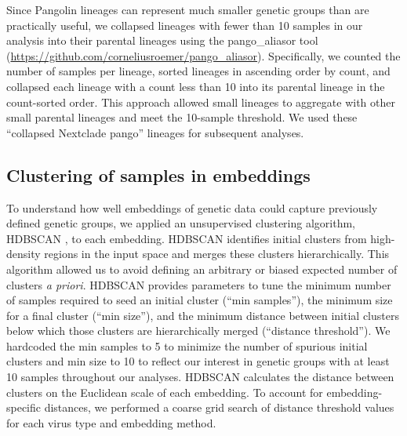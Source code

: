 \documentclass[10pt,letterpaper]{article}
\begin{document}
Since Pangolin lineages can represent much smaller genetic groups than are practically useful, we collapsed lineages with fewer than 10 samples in our analysis into their parental lineages using the pango\_aliasor tool (\href{https://github.com/corneliusroemer/pango_aliasor}{https://github.com/corneliusroemer/pango\_aliasor}).
Specifically, we counted the number of samples per lineage, sorted lineages in ascending order by count, and collapsed each lineage with a count less than 10 into its parental lineage in the count-sorted order.
This approach allowed small lineages to aggregate with other small parental lineages and meet the 10-sample threshold.
We used these ``collapsed Nextclade pango'' lineages for subsequent analyses.

\subsection*{Clustering of samples in embeddings}

To understand how well embeddings of genetic data could capture previously defined genetic groups, we applied an unsupervised clustering algorithm, HDBSCAN \cite{campello2015hierarchical}, to each embedding.
HDBSCAN identifies initial clusters from high-density regions in the input space and merges these clusters hierarchically.
This algorithm allowed us to avoid defining an arbitrary or biased expected number of clusters \emph{a priori}.
HDBSCAN provides parameters to tune the minimum number of samples required to seed an initial cluster (``min samples''), the minimum size for a final cluster (``min size''), and the minimum distance between initial clusters below which those clusters are hierarchically merged (``distance threshold'').
We hardcoded the min samples to 5 to minimize the number of spurious initial clusters and min size to 10 to reflect our interest in genetic groups with at least 10 samples throughout our analyses.
HDBSCAN calculates the distance between clusters on the Euclidean scale of each embedding.
To account for embedding-specific distances, we performed a coarse grid search of distance threshold values for each virus type and embedding method.
\end{document}
